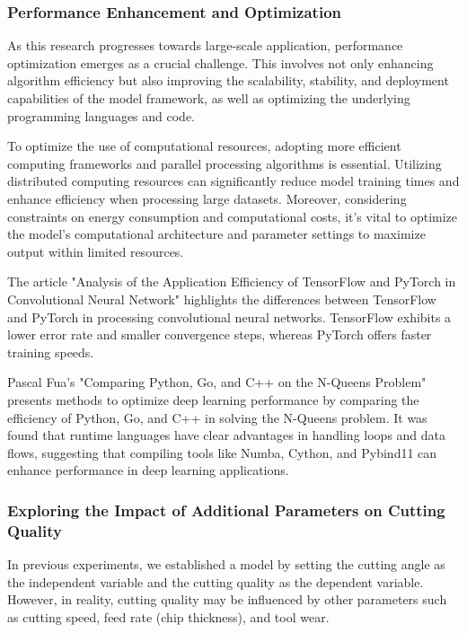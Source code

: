 

\subsubsection{Performance Enhancement and Optimization}

As this research progresses towards large-scale application, performance optimization emerges as a crucial challenge. This involves not only enhancing algorithm efficiency but also improving the scalability, stability, and deployment capabilities of the model framework, as well as optimizing the underlying programming languages and code.

To optimize the use of computational resources, adopting more efficient computing frameworks and parallel processing algorithms is essential. Utilizing distributed computing resources can significantly reduce model training times and enhance efficiency when processing large datasets. Moreover, considering constraints on energy consumption and computational costs, it's vital to optimize the model's computational architecture and parameter settings to maximize output within limited resources.

The article "Analysis of the Application Efficiency of TensorFlow and PyTorch in Convolutional Neural Network" highlights the differences between TensorFlow and PyTorch in processing convolutional neural networks\cite{6.2}. TensorFlow exhibits a lower error rate and smaller convergence steps, whereas PyTorch offers faster training speeds.

Pascal Fua's "Comparing Python, Go, and C++ on the N-Queens Problem" presents methods to optimize deep learning performance by comparing the efficiency of Python, Go, and C++ in solving the N-Queens problem\cite{6.3}. It was found that runtime languages have clear advantages in handling loops and data flows, suggesting that compiling tools like Numba, Cython, and Pybind11 can enhance performance in deep learning applications.




\subsubsection{Exploring the Impact of Additional Parameters on Cutting Quality}

In previous experiments, we established a model by setting the cutting angle as the independent variable and the cutting quality as the dependent variable. However, in reality, cutting quality may be influenced by other parameters such as cutting speed, feed rate (chip thickness), and tool wear.

